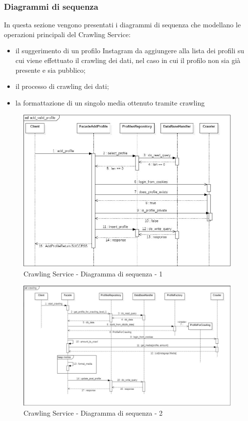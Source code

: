 \subsubsection{Diagrammi di sequenza}
In questa sezione vengono presentati i diagrammi di sequenza che modellano le operazioni principali del Crawling Service:
\begin{itemize}
    \item il suggerimento di un profilo Instagram da aggiungere alla lista dei profili su cui viene effettuato il crawling dei dati, nel caso in cui il profilo non sia già presente e sia pubblico;
    \item il processo di crawling dei dati;
    \item la formattazione di un singolo media ottenuto tramite crawling
\end{itemize}
\begin{figure}[!htp]
    \centering
    \includegraphics[scale=0.65]{Contenuto/Immagini/seq1-CS.JPG}
    \caption{Crawling Service - Diagramma di sequenza - 1}
\end{figure}
\begin{figure}[H]
    \centerfloat
    \includegraphics[scale=0.55]{Contenuto/Immagini/seq2-CS.JPG}
    \caption{Crawling Service - Diagramma di sequenza - 2}
\end{figure}
